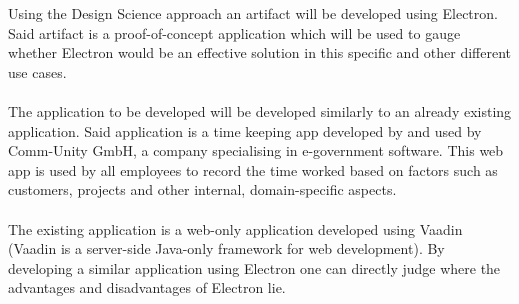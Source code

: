 
Using the Design Science approach \parencite{VaishnaviVijayKuechler} an artifact will be developed using Electron.
Said artifact is a proof-of-concept application which will be used to gauge whether Electron would be an effective
solution in this specific and other different use cases. \paragraph{}
The application to be developed will be developed similarly to an already existing application.
Said application is a time keeping app developed by and used by Comm-Unity GmbH, a company specialising in e-government
software.
This web app is used by all employees to record the time worked based on factors such as customers, projects and other
internal, domain-specific aspects.\paragraph{}
The existing application is a web-only application developed using Vaadin 
(Vaadin is a server-side Java-only framework for web development)\parencite{vaadinDocs}.
By developing a similar application using Electron one can directly judge where the advantages and 
disadvantages of Electron lie. 